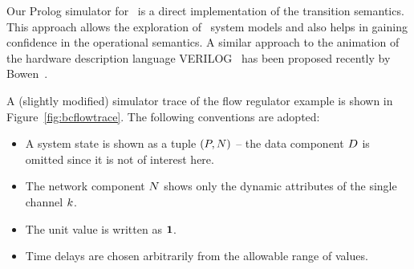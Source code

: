 Our Prolog simulator for \bcandle\ is a direct implementation of the
transition semantics. This approach allows the exploration of
\bcandle\ system models and also helps in gaining confidence in the 
operational semantics. A similar approach to the animation of
the hardware description language VERILOG~\cite{gol:96} has been proposed 
recently by Bowen~\cite{bow:99}. 

A (slightly modified) simulator trace of
the flow regulator example is shown in Figure~\ref{fig:bcflowtrace}. 
The following conventions are 
adopted:
\begin{itemize}
\item A system state is shown as a tuple $({P},{N})$ -- the data component
${D}$ is omitted since it is not of interest here.
\item The network component ${N}$ shows only the dynamic attributes of
  the single channel ${k}$.
\item The unit value is written as $\mathbf{1}$.
\item Time delays are chosen arbitrarily from the allowable range of
  values.
\end{itemize}

